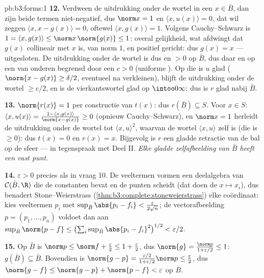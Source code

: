 \begin{solution}{pb:b3:forms:1}
\textbf{12.} Verdween de uitdrukking onder de wortel in een $x
\in \bar B$, dan zijn beide termen niet-negatief, dus $\norm x =
1$ en $\langle x, u(x)\rangle = 0$, dat wil zeggen $\langle x, x
- g(x)\rangle = 0$, oftewel $\langle x, g(x)\rangle = 1$. Volgens
Cauchy--Schwarz is $1 = \langle x, g(x)\rangle \leq \norm
x\,\norm{g(x)} \leq 1$: overal gelijkheid, wat afdwingt dat
$g(x)$ collineair met $x$ is, van norm $1$, en positief gericht:
dus $g(x) = x$ --- uitgesloten. De uitdrukking onder de wortel is
dus  en $> 0$ op $\bar B$, dus daar en op een  van
onderen begrensd door een $c > 0$ (uniforme ). Op die
 is $u$ glad ($\norm{x - g(x)} \geq \delta/2$, eventueel
na verkleinen), blijft de uitdrukking onder de wortel $\geq c/2$,
en is de vierkantswortel glad op $\intoo0\infty$: dus is $r$ glad
nabij $\bar B$.

\textbf{13.} $\norm{r(x)} = 1$ per constructie van $t(x)$: dus
$r(\bar B) \subseteq S$. Voor $x \in S$: $\langle x, u(x)\rangle
= \frac{1 - \langle x, g(x)\rangle}{\norm{x - g(x)}} \geq 0$
(opnieuw Cauchy--Schwarz), en $\norm x = 1$ herleidt de
uitdrukking onder de wortel tot $\langle x, u\rangle^2$, waarvan
de wortel $\langle x, u\rangle$ zelf is (die is $\geq 0$): dus
$t(x) = 0$ en $r(x) = x$. Bijgevolg is $r$ een gladde retractie
van de bal op de sfeer --- in tegenspraak met Deel II.
\emph{Elke gladde zelfafbeelding van $\bar B$ heeft een vast
punt.}

\textbf{14.} $\varepsilon > 0$ precies als in vraag 10. De
veeltermen vormen een deelalgebra van $\mathcal C(\bar B, \R)$
die de constanten bevat en de punten scheidt (dat doen de $x
\mapsto x_i$), dus benadert Stone--Weierstrass
(\cref{thm:b3:complete:stoneweierstrass}) elke coördinaat: kies
veeltermen $p_i$ met $\sup_{\bar B}\abs{p_i - f_i} <
\frac{\varepsilon}{2\sqrt n}$; de vectorafbeelding $p = (p_1,
\dots, p_n)$ voldoet dan aan $\sup_{\bar B}\norm{p - f} \leq
\bigl(\sum_i\sup_{\bar B}\abs{p_i - f_i}^2\bigr)^{1/2} <
\varepsilon/2$.

\textbf{15.} Op $\bar B$ is $\norm p \leq \norm f +
\frac\varepsilon2 \leq 1 + \frac\varepsilon2$, dus $\norm{g} =
\frac{\norm p}{1 + \varepsilon/2} \leq 1$: $g(\bar B) \subseteq
\bar B$. Bovendien is $\norm{g - p} = \frac{\varepsilon/2}{1 +
\varepsilon/2}\norm p \leq \frac\varepsilon2$, dus $\norm{g - f}
\leq \norm{g - p} + \norm{p - f} < \varepsilon$ op $\bar B$.


\end{solution}
